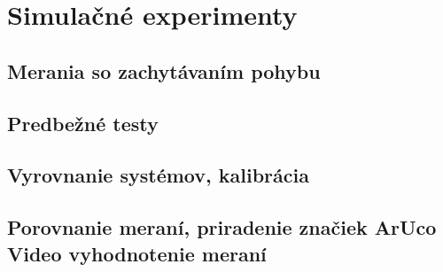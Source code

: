 \section{Simulačné experimenty}
\subsection{Merania so zachytávaním pohybu}  
\subsection{Predbežné testy}  
\subsection{Vyrovnanie systémov, kalibrácia}  
\subsection{Porovnanie meraní, priradenie značiek ArUco Video vyhodnotenie meraní}  